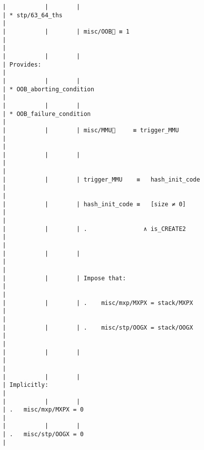 \documentclass[varwidth=\maxdimen,margin=0.5cm,multi={verbatim}]{standalone}
\begin{document}
\begin{verbatim}
|           |        |                                                      | * stp/63_64_ths                                                     |
|           |        | misc/OOB🚩 ≡ 1                                       |                                                                     |
|           |        |                                                      | Provides:                                                           |
|           |        |                                                      | * OOB_aborting_condition                                            |
|           |        |                                                      | * OOB_failure_condition                                             |
|           |        | misc/MMU🚩     ≡ trigger_MMU                         |                                                                     |
|           |        |                                                      |                                                                     |
|           |        | trigger_MMU    ≡   hash_init_code                    |                                                                     |
|           |        | hash_init_code ≡   [size ≠ 0]                        |                                                                     |
|           |        | .                ∧ is_CREATE2                        |                                                                     |
|           |        |                                                      |                                                                     |
|           |        | Impose that:                                         |                                                                     |
|           |        | .    misc/mxp/MXPX = stack/MXPX                      |                                                                     |
|           |        | .    misc/stp/OOGX = stack/OOGX                      |                                                                     |
|           |        |                                                      |                                                                     |
|           |        |                                                      | Implicitly:                                                         |
|           |        |                                                      | .   misc/mxp/MXPX = 0                                               |
|           |        |                                                      | .   misc/stp/OOGX = 0                                               |

\end{verbatim}
\end{document}
